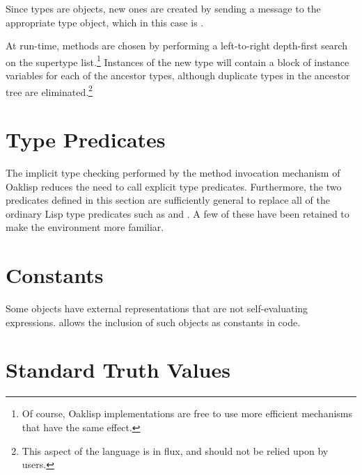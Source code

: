 Since types are objects, new ones are created by sending
a  message to the appropriate type object, which in this
case is .


At run-time, methods are chosen by performing a left-to-right
depth-first search on the supertype list.\footnote{Of course, Oaklisp
implementations are free to use more efficient mechanisms that have
the same effect.} Instances of the new type will contain a block of
instance variables for each of the ancestor types, although duplicate
types in the ancestor tree are eliminated.\footnote{This aspect of the
language is in flux, and should not be relied upon by users.}

\section{Type Predicates}

The implicit type checking performed by the method invocation
mechanism of Oaklisp reduces the need to call explicit type
predicates.  Furthermore, the two predicates defined in this section
are sufficiently general to replace all of the ordinary Lisp type
predicates such as  and .  A few of these have
been retained to make the environment more familiar.



\section{Constants}

Some objects have external representations that are not
self-evaluating expressions.   allows the inclusion of such
objects as constants in code.


\section{Standard Truth Values} \label{sec:truths}

